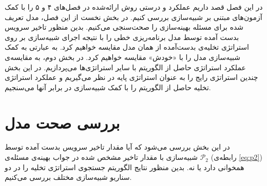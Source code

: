 در این فصل قصد داریم عملکرد و درستی روش ارائه‌شده در فصل‌های ۴ و ۵ را با کمک آزمون‌های مبتنی بر شبیه‌سازی بررسی کنیم. در بخش نخست از این فصل، مدل تعریف شده برای مسئله بهینه‌سازی را صحت‌سنجی می‌کنیم. بدین منظور تاخیر سرویس بدست آمده توسط مدل برنامه‌ریزی خطی را با نتیجه اجرای شبیه‌سازی بر روی استراتژی تخلیه‌ی بدست‌آمده از همان مدل مقایسه خواهیم کرد. به عبارتی به کمک شبیه‌سازی مدل را با «خودش» مقایسه خواهیم کرد. در بخش دوم، به مقایسه‌ی عملکرد استراتژی حاصل از الگوریتم با سایر استراتژی‌ها می‌پردازیم. در این بخش چندین استراتژی رایج را به عنوان استراتژی پایه در نظر می‌گیریم و عملکرد استراتژی تخلیه حاصل از الگوریتم را با کمک شبیه‌سازی در برابر آنها می‌سنجیم.
\section{بررسی صحت مدل}
در این بخش بررسی می‌شود که آیا مقدار تاخیر سرویس بدست آمده توسط شبیه‌سازی با مقدار تاخیر مشخص شده در جواب بهینه‌ی مسئله‌ی 
$\mathcal{P}_2$
 (رابطه‌ی \ref{eq:p2}) همخوانی دارد یا نه. بدین منظور نتایج الگوریتم جستجوی استراتژی تخلیه را در دو سناریو شبیه‌سازی مختلف بررسی می‌کنیم.
